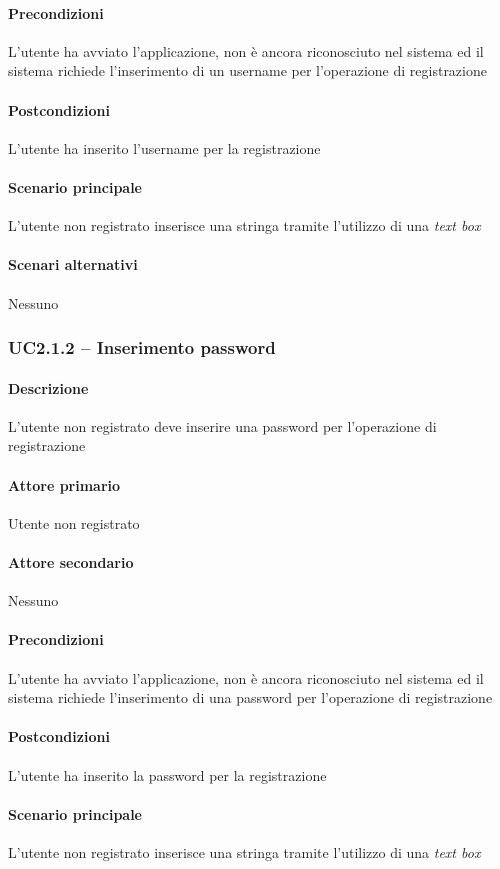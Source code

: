 \paragraph{Precondizioni}  L’utente ha avviato l’applicazione, non è ancora riconosciuto nel sistema ed il sistema richiede l’inserimento di un username per l’operazione di registrazione
\paragraph{Postcondizioni}  L’utente ha inserito l’username per la registrazione
\paragraph{Scenario principale}  
L’utente non registrato inserisce una stringa tramite l’utilizzo di una \textit{text box}
\paragraph{Scenari alternativi}  Nessuno


\subsubsection{UC2.1.2 – Inserimento password}
\paragraph{Descrizione}  L’utente non registrato deve inserire una password per l’operazione di registrazione
\paragraph{Attore primario}  Utente non registrato
\paragraph{Attore secondario}  Nessuno
\paragraph{Precondizioni}  L’utente ha avviato l’applicazione, non è ancora riconosciuto nel sistema ed il sistema richiede l’inserimento di una password per l’operazione di registrazione
\paragraph{Postcondizioni}  L’utente ha inserito la password per la registrazione
\paragraph{Scenario principale}  
L’utente non registrato inserisce una stringa tramite l’utilizzo di una \textit{text box}
